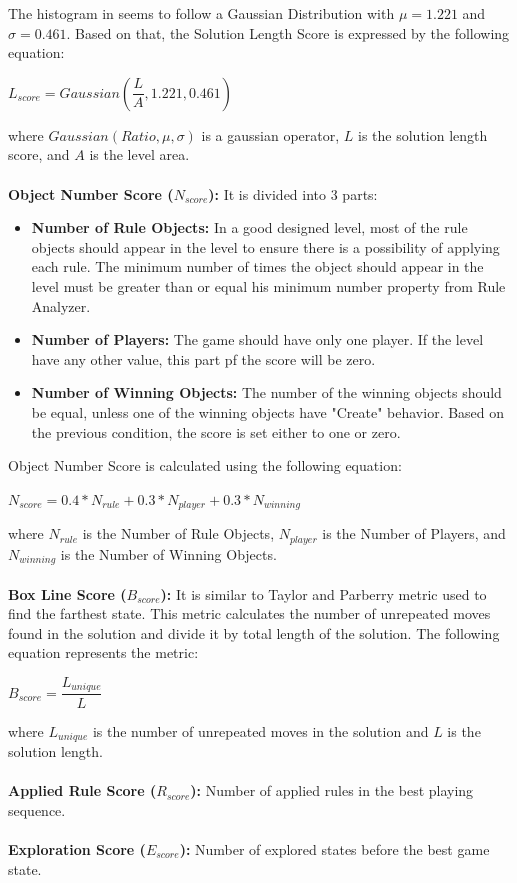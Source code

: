 The histogram in  seems to follow a Gaussian Distribution with $\mu = 1.221$ and $\sigma = 0.461$. Based on that, the Solution Length Score is expressed by the following equation:
\begin{center}$L_{score} = Gaussian(\dfrac{L}{A}, 1.221, 0.461)$\end{center}
where $Gaussian(Ratio, \mu, \sigma)$ is a gaussian operator, $L$ is the solution length score, and $A$ is the level area.\\\\
\textbf{Object Number Score ($N_{score}$):} It is divided into 3 parts:
\begin{itemize} \itemsep0pt \parskip0pt 
	\item \textbf{Number of Rule Objects:} In a good designed level, most of the rule objects should appear in the level to ensure there is a possibility of applying each rule. The minimum number of times the object should appear in the level must be greater than or equal his minimum number property from Rule Analyzer.
	\item \textbf{Number of Players:} The game should have only one player. If the level have any other value, this part pf the score will be zero.
	\item \textbf{Number of Winning Objects:} The number of the winning objects should be equal, unless one of the winning objects have "Create" behavior. Based on the previous condition, the score is set either to one or zero.
\end{itemize}
Object Number Score is calculated using the following equation:
\begin{center}$N_{score} = 0.4 * N_{rule} + 0.3 * N_{player} + 0.3 * N_{winning}$\end{center}
where $N_{rule}$ is the Number of Rule Objects, $N_{player}$ is the Number of Players, and $N_{winning}$ is the Number of Winning Objects.\\\\
\textbf{Box Line Score ($B_{score}$):} It is similar to Taylor and Parberry\cite{sokobanLevelGenerationNew} metric used to find the farthest state. This metric calculates the number of unrepeated moves found in the solution and divide it by total length of the solution. The following equation represents the metric:
\begin{center}$B_{score} = \dfrac{L_{unique}}{L}$\end{center}
where $L_{unique}$ is the number of unrepeated moves in the solution and $L$ is the solution length.\\\\
\textbf{Applied Rule Score ($R_{score}$):} Number of applied rules in the best playing sequence.\\\\
\textbf{Exploration Score ($E_{score}$):} Number of explored states before the best game state.

